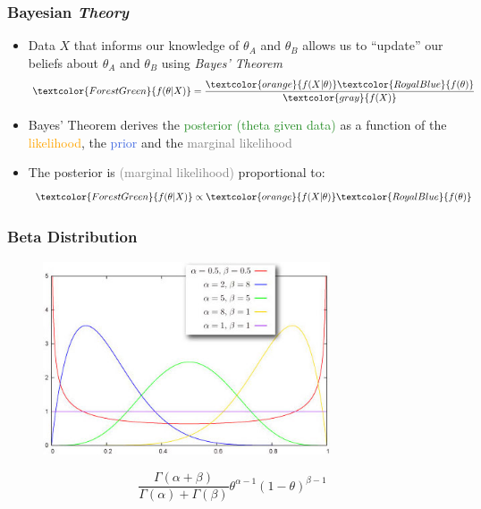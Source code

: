 \documentclass[xcolor={dvipsnames}]{beamer}
\begin{document}
\frame
{
\frametitle{Bayesian \emph{Theory}}

\begin{itemize}
\item Data $X$ that informs our knowledge of $\theta_A$ and $\theta_B$ 
allows us to ``update'' our beliefs about $\theta_A$ and $\theta_B$ using \emph{Bayes' Theorem}
$$\textcolor{ForestGreen}{f(\theta|X)} = \frac{\textcolor{orange}{f(X|\theta)}\textcolor{RoyalBlue}{f(\theta)}}{\textcolor{gray}{f(X)}}$$
\item<2-> Bayes' Theorem derives the \textcolor{ForestGreen}{posterior (theta given data)} as a function of the
\textcolor{orange}{likelihood}, the \textcolor{RoyalBlue}{prior} and the \textcolor{gray}{marginal likelihood}
\item<3-> The posterior is \textcolor{gray}{(marginal likelihood)} proportional to:
$$\textcolor{ForestGreen}{f(\theta|X)} \propto \textcolor{orange}{f(X|\theta)}\textcolor{RoyalBlue}{f(\theta)}$$
\end{itemize}

\vspace{-2.5em}
\begin{figure}
\centering
{}
\end{figure}

}


\frame
{
\frametitle{Beta Distribution}

\begin{figure}
\centering
\includegraphics[height=2.25in]{stuff/plotBeta.jpg}
\end{figure}
\Huge$$\frac{\Gamma(\alpha+\beta)}{\Gamma(\alpha)+\Gamma(\beta)}\theta^{\alpha - 1}(1-\theta)^{\beta - 1}$$

}
\end{document}
